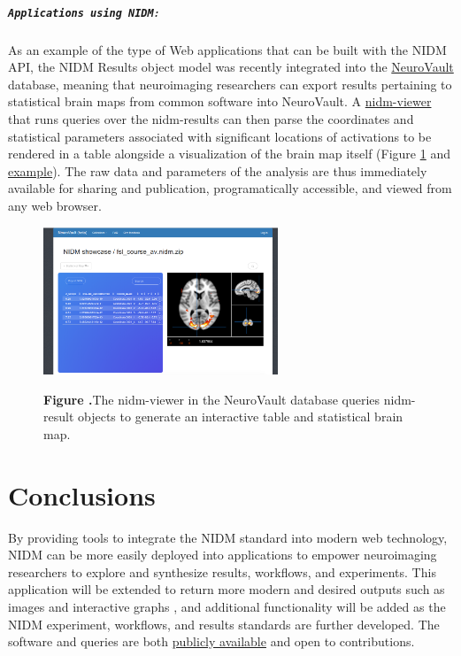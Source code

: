 \documentclass[twocolumn]{bmcart}%
\begin{document}
\subparagraph{\texorpdfstring{\texttt{Applications using NIDM}:}{:}}\label{section}
As an example of the type of Web applications that can be built with the NIDM API, the NIDM Results object model \cite{noauthor_undated-if} was recently integrated into the \href{http://www.neurovault.org}{NeuroVault} database, meaning that neuroimaging researchers can export results pertaining to statistical brain maps from common software \cite{Jenkinson2012-pr} into NeuroVault. A \href{https://github.com/vsoch/nidmviewer}{nidm-viewer} that runs queries over the nidm-results can then parse the coordinates and statistical parameters associated with significant locations of activations to be rendered in a table alongside a visualization of the brain map itself (Figure \ref{fig:02} and \href{http://neurovault.org/collections/877/fsl_course_av.nidm}{example}). The raw data and parameters of the analysis are thus immediately available for sharing and publication, programatically accessible, and viewed from any web browser. 

\begin{figure}[h!]
\begin{center}
\includegraphics[width=7cm]{img/figure2}
\end{center}
 \textbf{\label{fig:02}Figure .}{The nidm-viewer in the NeuroVault database queries nidm-result objects to generate an interactive table and statistical brain map.}
\end{figure}

\section{Conclusions}\label{conclusions}

By providing tools to integrate the NIDM standard into modern web technology, NIDM can be more easily deployed into applications to empower neuroimaging researchers to explore and synthesize results, workflows, and experiments. This application will be extended to return more modern and desired outputs such as images and interactive graphs \cite{noauthor_undated-fs}, and additional functionality will be added as the NIDM experiment, workflows, and results standards are further developed. The software and queries are both \href{https://github.com/incf-nidash}{publicly available} and open to contributions.
\end{document}
